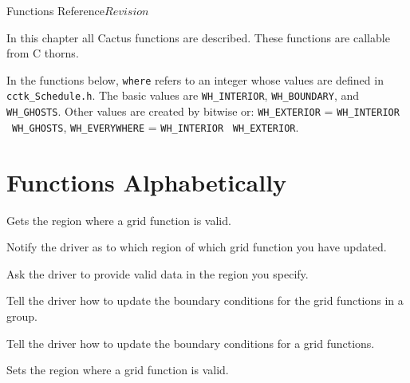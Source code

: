 \begin{cactuspart}{ Functions Reference}{}{$Revision$}
\label{part:DriverReference}
\renewcommand{\thepage}{\Alph{part}\arabic{page}}

In this chapter all  Cactus functions are described.
These functions are callable from C thorns.

In the functions below, \texttt{where} refers to an integer whose values are defined in \texttt{cctk\_Schedule.h}. The basic values are \texttt{WH\_INTERIOR}, \texttt{WH\_BOUNDARY}, and \texttt{WH\_GHOSTS}. Other values are created by bitwise or: \texttt{WH\_EXTERIOR} = \texttt{WH\_INTERIOR} \textbar~\texttt{WH\_GHOSTS}, \texttt{WH\_EVERYWHERE} = \texttt{WH\_INTERIOR} \textbar~\texttt{WH\_EXTERIOR}.


\chapter{Functions Alphabetically}

\begin{Lentry}

\item[\code{Driver\_GetValidRegion}] [\pageref{Driver-GetValidRegion}]
Gets the region where a grid function is valid.

\item[\code{Driver\_NotifyDataModified}] [\pageref{Driver-NotifyDataModified}]
Notify the driver as to which region of which grid function you have updated.

\item[\code{Driver\_RequireValidData}] [\pageref{Driver-RequireValidData}]
Ask the driver to provide valid data in the region you specify.

\item[\code{Driver\_SelectGroupForBC}] [\pageref{Driver-SelectGroupForBC}]
Tell the driver how to update the boundary conditions for the grid functions in a group.

\item[\code{Driver\_SelectVarForBC}] [\pageref{Driver-SelectVarForBC}]
Tell the driver how to update the boundary conditions for a grid functions.

\item[\code{Driver\_SetValidRegion}] [\pageref{Driver-SetValidRegion}]
Sets the region where a grid function is valid.


\end{Lentry}
\end{cactuspart}
